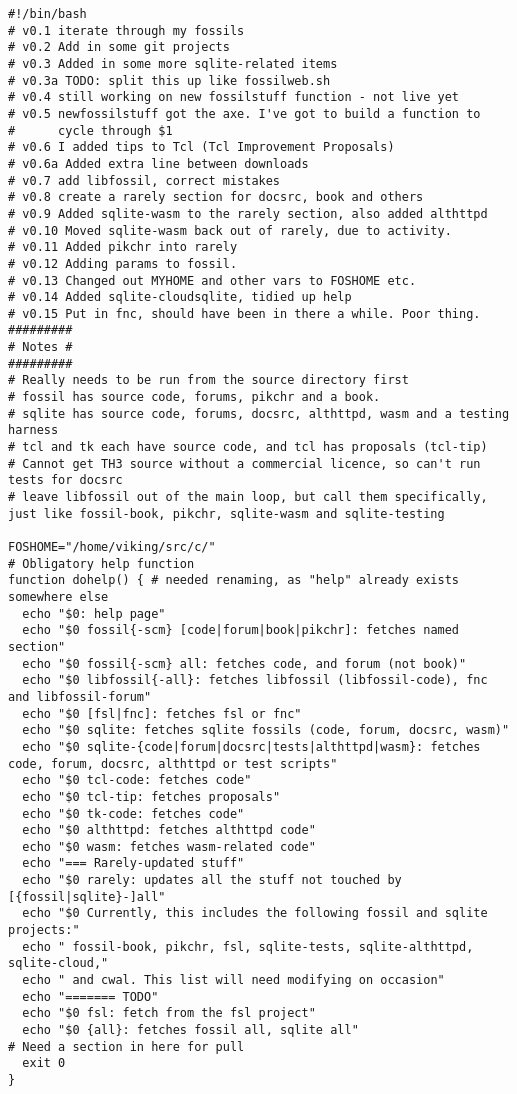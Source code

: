\documentclass[11pt]{article}
\begin{document}
\begin{verbatim}
#!/bin/bash
# v0.1 iterate through my fossils
# v0.2 Add in some git projects
# v0.3 Added in some more sqlite-related items
# v0.3a TODO: split this up like fossilweb.sh
# v0.4 still working on new fossilstuff function - not live yet
# v0.5 newfossilstuff got the axe. I've got to build a function to
#      cycle through $1
# v0.6 I added tips to Tcl (Tcl Improvement Proposals)
# v0.6a Added extra line between downloads
# v0.7 add libfossil, correct mistakes
# v0.8 create a rarely section for docsrc, book and others
# v0.9 Added sqlite-wasm to the rarely section, also added althttpd
# v0.10 Moved sqlite-wasm back out of rarely, due to activity.
# v0.11 Added pikchr into rarely
# v0.12 Adding params to fossil.
# v0.13 Changed out MYHOME and other vars to FOSHOME etc.
# v0.14 Added sqlite-cloudsqlite, tidied up help
# v0.15 Put in fnc, should have been in there a while. Poor thing.
#########
# Notes #
#########
# Really needs to be run from the source directory first
# fossil has source code, forums, pikchr and a book.
# sqlite has source code, forums, docsrc, althttpd, wasm and a testing harness
# tcl and tk each have source code, and tcl has proposals (tcl-tip)
# Cannot get TH3 source without a commercial licence, so can't run tests for docsrc
# leave libfossil out of the main loop, but call them specifically, just like fossil-book, pikchr, sqlite-wasm and sqlite-testing

FOSHOME="/home/viking/src/c/"
# Obligatory help function
function dohelp() { # needed renaming, as "help" already exists somewhere else
  echo "$0: help page"
  echo "$0 fossil{-scm} [code|forum|book|pikchr]: fetches named section"
  echo "$0 fossil{-scm} all: fetches code, and forum (not book)"
  echo "$0 libfossil{-all}: fetches libfossil (libfossil-code), fnc and libfossil-forum"
  echo "$0 [fsl|fnc]: fetches fsl or fnc"
  echo "$0 sqlite: fetches sqlite fossils (code, forum, docsrc, wasm)"
  echo "$0 sqlite-{code|forum|docsrc|tests|althttpd|wasm}: fetches code, forum, docsrc, althttpd or test scripts"
  echo "$0 tcl-code: fetches code"
  echo "$0 tcl-tip: fetches proposals"
  echo "$0 tk-code: fetches code"
  echo "$0 althttpd: fetches althttpd code"
  echo "$0 wasm: fetches wasm-related code"
  echo "=== Rarely-updated stuff"
  echo "$0 rarely: updates all the stuff not touched by [{fossil|sqlite}-]all"
  echo "$0 Currently, this includes the following fossil and sqlite projects:"
  echo " fossil-book, pikchr, fsl, sqlite-tests, sqlite-althttpd, sqlite-cloud,"
  echo " and cwal. This list will need modifying on occasion"
  echo "======= TODO"
  echo "$0 fsl: fetch from the fsl project"
  echo "$0 {all}: fetches fossil all, sqlite all"
# Need a section in here for pull
  exit 0
}


\end{verbatim}
\end{document}
